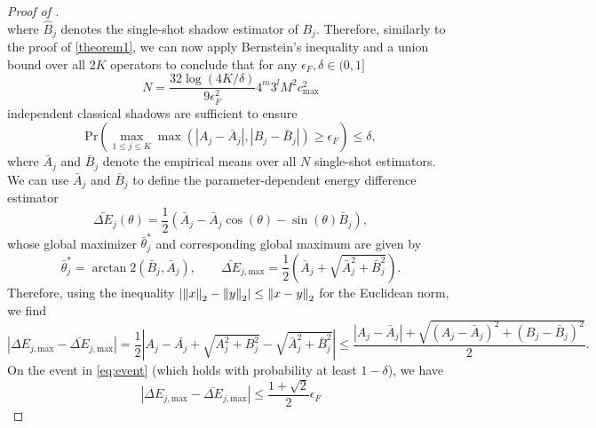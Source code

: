 \begin{proof}[Proof of ]
\begin{equation}
    \end{equation}
    where $\hat{B}_j$ denotes the single-shot shadow estimator of $B_j$. Therefore, similarly to the proof of \cref{theorem1}, we can now apply Bernstein's inequality and a union bound over all $2K$ operators to conclude that for any $\epsilon_F, \delta \in (0,1]$
    \begin{equation}
        N=\frac{32\log(4K/\delta)}{9\epsilon^2_F}4^m3^lM^2c^2_\mathrm{max}
    \end{equation}
    independent classical shadows are sufficient to ensure
    \begin{equation}
        \label{eq:event}
        \mathrm{Pr}\left(\max_{1\leq j\leq K}\max\left(\left|A_j-\bar{A}_j\right|, \left|B_j-\bar{B}_j\right|\right)\geq \epsilon_F\right)\leq \delta,
    \end{equation}
    where $\bar{A}_j$ and $\bar{B}_j$ denote the empirical means over all $N$ single-shot estimators. 
    We can use $\bar{A}_j$ and $\bar{B}_j$ to define the parameter-dependent energy difference estimator
    \begin{equation}
        \bar{\Delta E}_j(\theta)=\frac{1}{2}(\bar{A}_j-\bar{A}_j\cos(\theta)-\sin(\theta)\bar{B}_j), 
    \end{equation}
    whose global maximizer $\bar{\theta}^*_j$ and corresponding global maximum are given by
    \begin{equation}
        \bar{\theta}^*_j=\arctan2(\bar{B}_j, \bar{A}_j),\qquad \bar{\Delta E}_{j, \mathrm{max}}=\frac{1}{2}\left(\bar{A}_j+\sqrt{\bar{A}^2_j+\bar{B}^2_j} \right).
    \end{equation}
    Therefore, using the inequality $\left|\norm{x}_2-\norm{y}_2\right|\leq \norm{x-y}_2$ for the Euclidean norm, we find
    \begin{equation}
        |\Delta E_{j, \mathrm{max}}-\bar{\Delta E}_{j, \mathrm{max}}|=\frac{1}{2}\left|A_j-\bar{A_j}+\sqrt{A^2_j+B^2_j}-\sqrt{\bar{A}^2_j+\bar{B}^2_j} \right|\leq \frac{\left|A_j-\bar{A}_j\right|+\sqrt{\left(A_j-\bar{A}_j\right)^2+\left(B_j-\bar{B}_j\right)^2}}{2}.
    \end{equation}
    On the event in \cref{eq:event} (which holds with probability at least $1-\delta$), we have
    \begin{equation}
        |\Delta E_{j, \mathrm{max}}-\bar{\Delta E}_{j, \mathrm{max}}|\leq \frac{1+\sqrt{2}}{2}\epsilon_F

\end{equation}
\end{proof}

